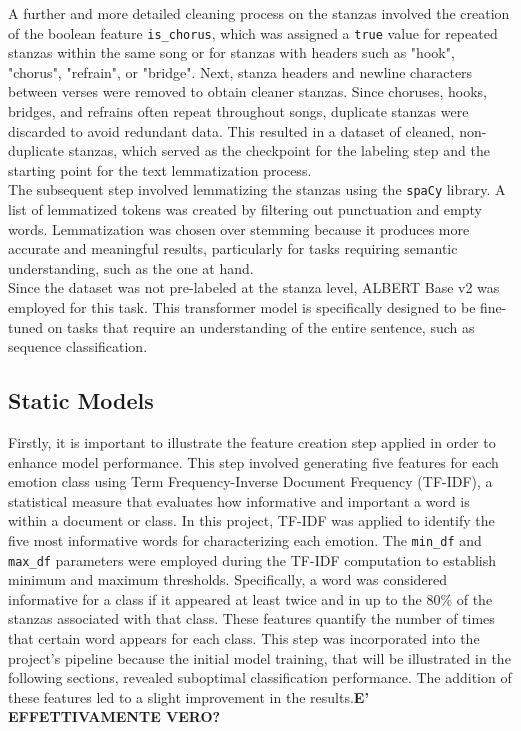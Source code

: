 A further and more detailed cleaning process on the stanzas involved the creation
of the boolean feature \texttt{is\_chorus}, which was assigned a \texttt{true}
value for repeated stanzas within the same song or for stanzas with headers such
as "hook", "chorus", "refrain", or "bridge".
Next, stanza headers and newline characters between verses were removed to obtain
cleaner stanzas.
Since choruses, hooks, bridges, and refrains often repeat throughout songs,
duplicate stanzas were discarded to avoid redundant data. This resulted in a
dataset of cleaned, non-duplicate stanzas, which served as the checkpoint for
the labeling step and the starting point for the text lemmatization process.\\

The subsequent step involved lemmatizing the stanzas using the \texttt{spaCy}
library. A list of lemmatized tokens was created by filtering out punctuation
and empty words. Lemmatization was chosen over stemming because it produces
more accurate and meaningful results, particularly for tasks requiring semantic
understanding, such as the one at hand.\\

Since the dataset was not pre-labeled at the stanza level, ALBERT Base v2 was employed for this task.
This transformer model is specifically designed to be fine-tuned on tasks that
require an understanding of the entire sentence, such as sequence classification.\\



\subsection*{Static Models}
Firstly, it is important to illustrate the feature creation step applied in order to enhance model performance. 
This step involved generating five features for each emotion class using Term Frequency-Inverse Document Frequency (TF-IDF), a statistical measure that evaluates how informative and important a word is within a document or class.
In this project, TF-IDF was applied to identify the five most informative words for characterizing each emotion.
The \texttt{min\_df} and \texttt{max\_df} parameters were employed during the TF-IDF computation to establish minimum and maximum thresholds.
Specifically, a word was considered informative for a class if it appeared at least twice and in up to the 80\% of the stanzas associated with that class.
These features quantify the number of times that certain word appears for each class.
This step was incorporated into the project's pipeline because the initial model training, that will be illustrated in the following sections, revealed suboptimal classification performance. 
The addition of these features led to a slight improvement in the results.\textbf{E' EFFETTIVAMENTE VERO?}\\

